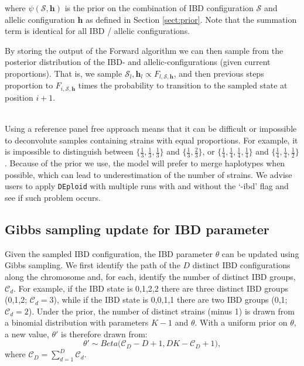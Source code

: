 \documentclass[9pt,lineno]{elife}
\begin{document}
\begin{appendixbox}
\noindent where $\psi(\mathcal{S},\mathbf{h})$ is the prior on the combination of IBD configuration $\mathcal{S}$ and allelic configuration $\mathbf{h}$ as defined in Section \ref{sect:prior}.  Note that the summation term is identical for all IBD / allelic configurations.

By storing the output of the Forward algorithm we can then sample from the posterior distribution of the IBD- and allelic-configurations (given current proportions).  That is, we sample $\mathcal{S}_l,\mathbf{h}_l \propto F_{l,\mathcal{S}, \mathbf{h}}$, and then previous steps proportion to $F_{i,\mathcal{S}, \mathbf{h}}$ times the probability to transition to the sampled state at position $i+1$.

\vspace{.2cm}

\\
Using a reference panel free approach means that it can be difficult or impossible to deconvolute samples containing strains with equal proportions. For example, it is impossible to distinguish between $\{\frac{1}{3},\frac{1}{3},\frac{1}{3}\}$ and $\{\frac{1}{3},\frac{2}{3}\}$, or
$\{\frac{1}{4},\frac{1}{4}, \frac{1}{4}, \frac{1}{4}\}$ and $\{\frac{1}{4},\frac{1}{4}, \frac{1}{2}\}$. Because of the prior we use, the model will prefer to merge haplotypes when possible, which can lead to underestimation of the number of strains. We advise users to apply {\tt DEploid} with multiple runs with and without the `-ibd' flag and see if such problem occurs.


\subsection{Gibbs sampling update for IBD parameter}

Given the sampled IBD configuration, the IBD parameter $\theta$ can be updated using Gibbs sampling.  We first identify the path of the $D$ distinct IBD configurations along the chromosome and, for each, identify the number of distinct IBD groups, $\mathcal{C}_d$.  For example, if the IBD state is 0,1,2,2 there are three distinct IBD groups (0,1,2; $\mathcal{C}_d = 3$), while if the IBD state is 0,0,1,1 there are two IBD groups (0,1; $\mathcal{C}_d = 2$).  Under the prior, the number of distinct strains (minus 1) is drawn from a binomial distribution with parameters $K-1$ and $\theta$.  With a uniform prior on $\theta$, a new value, $\theta'$ is therefore drawn from:
\begin{equation*}
    \theta' \sim Beta \big(\mathcal{C}_D - D + 1, D K-\mathcal{C}_D + 1\big),
\end{equation*}
\noindent where $\mathcal{C}_D = \sum_{d=1}^D \mathcal{C}_d$.



\end{appendixbox}
\end{document}
